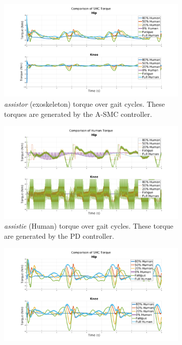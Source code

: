 \begin{figure}
    \centering
    \begin{subfigure}{0.8\linewidth}
        \centering
        \includegraphics[width=\columnwidth]{images/controllers/gait/SMC.png}
        \caption[A-SMC Torque Over Gait Cycles]{\textit{assistor} (exoskeleton) torque over gait cycles. These torques are generated by the A-SMC controller.}
        \label{fig:SMCTripleGaitMotion}
    \end{subfigure}
    \begin{subfigure}{0.8\linewidth}
        \centering
        \includegraphics[width=\columnwidth]{images/controllers/gait/human.png}
        \caption[Human Torque Over Gait Cycles]{ \textit{assistie} (Human) torque over gait cycles. These torque are generated by the PD controller.}
        \label{fig:HumanTripleGaitMotion}
    \end{subfigure}
        \begin{subfigure}{0.8\linewidth}
        \centering
        \includegraphics[width=\columnwidth]{images/controllers/gait/feedback.png}

\end{subfigure}
\end{figure}
